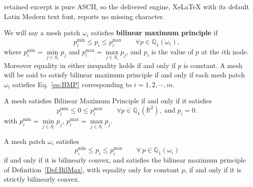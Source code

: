 \documentclass[10pt,a4paper]{amsart}
\begin{document}
retained excerpt is pure ASCII, so the delivered engine, XeLaTeX with its default Latin Modern text font, reports no missing character.
\begin{definition}
We will say a mesh patch $\omega_i$ satisfies \textbf{bilinear maximum principle} if 
\begin{equation}
p_i^{\min} \leq p_i \leq p_i^{\max} \qquad \forall p \in \mathbb{Q}_1(\omega_i), \label{eq:BMP}
\end{equation}
where $p_i^{\min} = \min\limits_{j \in S_i} p_j$ and $p_i^{\max}=\max\limits_{j \in S_i} p_j$, and $p_i$ is the value of $p$ at the $i$th node. Moreover equality in either inequality holds if and only if $p$ is constant.  A mesh will be said to satisfy bilinear maximum principle if and only if each mesh patch $\omega_i$ satisfies Eq.~\eqref{eq:BMP} corresponding to $i=1,2,\cdots,m$.	\label{Def:BilMax}
 \end{definition}

\begin{lemma}
A mesh satisfies Bilinear Maximum Principle if and only if it satisfies
\begin{equation}
p_i^{\min} \leq 0 \leq p_i^{\max} \qquad \forall p \in \mathbb{Q}_1(\mathbb{R}^2),\; \text{and} \; p_i =0.   \label{eq:BMP2}
\end{equation}
with $p_i^{\min} = \min\limits_{j \in S_i} p_j$, $p_i^{\max}=\max\limits_{j \in S_i} p_j$.\label{lem:BMP2}
\end{lemma}

\begin{theorem}
A mesh patch $\omega_i$ satisfies
\begin{equation*}
	p_i^{\min} \le p_i \le p_i^{\max} \qquad \forall\, p \in \mathbb{Q}_1(\omega_i)
\end{equation*}
if and only if it is bilinearly convex, and satisfies the bilinear maximum principle of Definition~\ref{Def:BilMax}, with equality only for constant $p$, 	if and only if it is strictly bilinearly convex.\label{thm:BMPiffBC}
\end{theorem}
\end{document}
